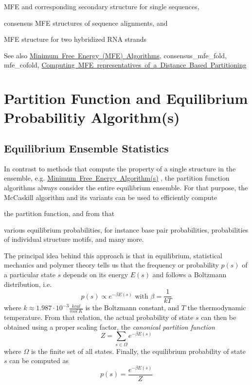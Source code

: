 \begin{DoxyItemize}
\item M\+FE and corresponding secondary structure for single sequences,
\item consensus M\+FE structures of sequence alignments, and
\item M\+FE structure for two hybridized R\+NA strands
\end{DoxyItemize}

\begin{DoxySeeAlso}{See also}
\mbox{\hyperlink{group__mfe}{Minimum Free Energy (M\+FE) Algorithms}}, consensus\+\_\+mfe\+\_\+fold, mfe\+\_\+cofold, \mbox{\hyperlink{group__kl__neighborhood__mfe}{Computing M\+FE representatives of a Distance Based Partitioning}}
\end{DoxySeeAlso}
 \hypertarget{pf_algorithm}{}\section{Partition Function and Equilibrium Probabilitiy Algorithm(s)}\label{pf_algorithm}
\hypertarget{pf_algorithm_sec_pf_intro}{}\subsection{Equilibrium Ensemble Statistics}\label{pf_algorithm_sec_pf_intro}
In contrast to methods that compute the property of a single structure in the ensemble, e.\+g. \mbox{\hyperlink{mfe_algorithm}{Minimum Free Energy Algorithm(s)}} , the partition function algorithms always consider the entire equilibrium ensemble. For that purpose, the Mc\+Caskill algorithm \cite{mccaskill:1990} and its variants can be used to efficiently compute


\begin{DoxyItemize}
\item the partition function, and from that
\item various equilibrium probabilities, for instance base pair probabilities, probabilities of individual structure motifs, and many more.
\end{DoxyItemize}

The principal idea behind this approach is that in equilibrium, statistical mechanics and polymer theory tells us that the frequency or probability $p(s)$ of a particular state $s$ depends on its energy $E(s)$ and follows a Boltzmann distribution, i.\+e. \[ p(s) \propto e^{-\beta E(s)} \text{ with } \beta = \frac{1}{kT} \] where $k \approx 1.987 \cdot 10^{-3} \frac{kcal}{mol~K}$ is the Boltzmann constant, and $T$ the thermodynamic temperature. From that relation, the actual probability of state $s$ can then be obtained using a proper scaling factor, the {\itshape canonical partition function} \[ Z = \sum_{s \in \Omega} e^{-\beta E(s)} \] where $\Omega$ is the finite set of all states. Finally, the equilibrium probability of state $s$ can be computed as \[ p(s) = \frac{e^{-\beta E(s)}}{Z} \]

